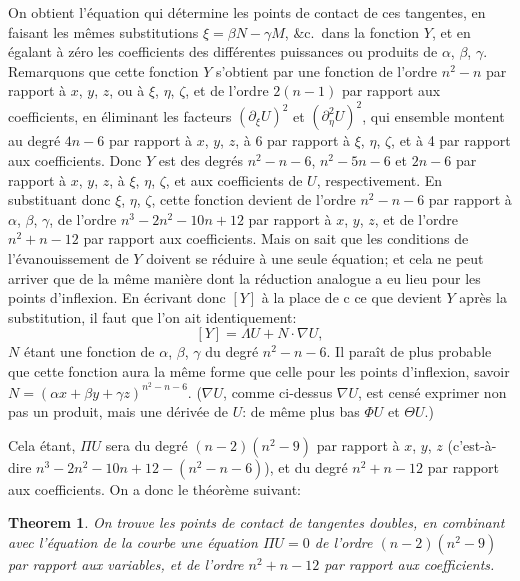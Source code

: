 \documentclass[11pt,a4paper]{article}
\theoremstyle{plain}
\newtheorem{theorem}{Theorem}
\theoremstyle{definition}
\begin{document}
On obtient l'\'{e}quation qui d\'{e}termine les points de contact de ces tangentes, en
faisant les m\^{e}mes substitutions $\xi = \beta N - \gamma M$, \&c.\ dans la fonction $Y$,
et en \'{e}galant \`{a} z\'{e}ro les coefficients des diff\'{e}rentes puissances ou produits de
$\alpha$, $\beta$, $\gamma$. Remarquons que cette fonction $Y$ s'obtient par une fonction de
l'ordre $n^2 - n$ par rapport \`{a} $x$, $y$, $z$, ou \`{a} $\xi$, $\eta$, $\zeta$, et de l'ordre
$2(n-1)$ par rapport aux coefficients, en \'{e}liminant les facteurs $(\partial_\xi U)^2$ et
$(\partial_\eta^2 U)^2$, qui ensemble montent au degr\'{e} $4n-6$ par rapport \`{a} $x$, $y$, $z$,
\`{a} 6 par rapport \`{a} $\xi$, $\eta$, $\zeta$, et \`{a} 4 par rapport aux coefficients.
Donc $Y$ est des degr\'{e}s $n^2 - n - 6$, $n^2 - 5n - 6$ et $2n - 6$ par rapport
\`{a} $x$, $y$, $z$, \`{a} $\xi$, $\eta$, $\zeta$, et aux coefficients de $U$, respectivement.
En substituant donc $\xi$, $\eta$, $\zeta$, cette fonction devient de l'ordre $n^2 - n - 6$
par rapport \`{a} $\alpha$, $\beta$, $\gamma$, de l'ordre $n^3 - 2n^2 - 10n + 12$ par rapport
\`{a} $x$, $y$, $z$, et de l'ordre $n^2 + n - 12$ par rapport aux coefficients.
Mais on sait que les conditions de l'\'{e}vanouissement de $Y$ doivent se r\'{e}duire \`{a}
une seule \'{e}quation; et cela ne peut arriver que de la m\^{e}me mani\`{e}re dont la r\'{e}duction
analogue a eu lieu pour les points d'inflexion. En \'{e}crivant donc $[Y]$ \`{a} la place de
c ce que devient $Y$ apr\`{e}s la substitution, il faut que l'on ait identiquement:
\[
[Y] = \Lambda U + N \cdot \nabla U,
\]
$N$ \'{e}tant une fonction de $\alpha$, $\beta$, $\gamma$ du degr\'{e} $n^2 - n - 6$.
Il para\^{i}t de plus probable que cette fonction aura la m\^{e}me forme que celle pour
les points d'inflexion, savoir $N = (\alpha x + \beta y + \gamma z)^{n^2-n-6}$.
($\nabla U$, comme ci-dessus $\nabla U$, est cens\'{e} exprimer non pas un produit, mais une
d\'{e}riv\'{e}e de $U$: de m\^{e}me plus bas $\Phi U$ et $\Theta U$.)


Cela \'{e}tant, $\Pi U$ sera du degr\'{e} $(n-2)(n^2-9)$ par rapport \`{a} $x$, $y$, $z$
(c'est-\`{a}-dire $n^3 - 2n^2 - 10n + 12 - (n^2 - n - 6)$), et du degr\'{e}
$n^2 + n - 12$ par rapport aux coefficients.
On a donc le th\'{e}or\`{e}me suivant:

\begin{theorem}
On trouve les points de contact de tangentes doubles, en combinant avec l'\'{e}quation
de la courbe une \'{e}quation $\Pi U = 0$ de l'ordre $(n-2)(n^2-9)$ par rapport
aux variables, et de l'ordre $n^2 + n - 12$ par rapport aux coefficients.
\end{theorem}
\end{document}
